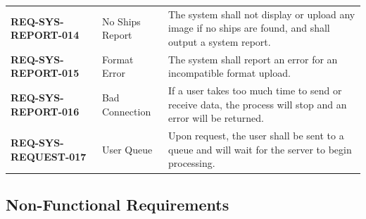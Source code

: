 \documentclass{article}
\begin{document}
\begin{longtable}{>{\bfseries}p{4.5cm}p{3.5cm}p{6.5cm}}
REQ-SYS-REPORT-014 & No Ships Report & The system shall not display or upload any image if no ships are found, and shall output a system report. \\
REQ-SYS-REPORT-015 & Format Error & The system shall report an error for an incompatible format upload. \\
REQ-SYS-REPORT-016 & Bad Connection & If a user takes too much time to send or receive data, the process will stop and an error will be returned. \\
REQ-SYS-REQUEST-017 & User Queue & Upon request, the user shall be sent to a queue and will wait for the server to begin processing. \\
\end{longtable}

\subsection{Non-Functional Requirements}
\renewcommand{\arraystretch}{1.5}
\end{document}
